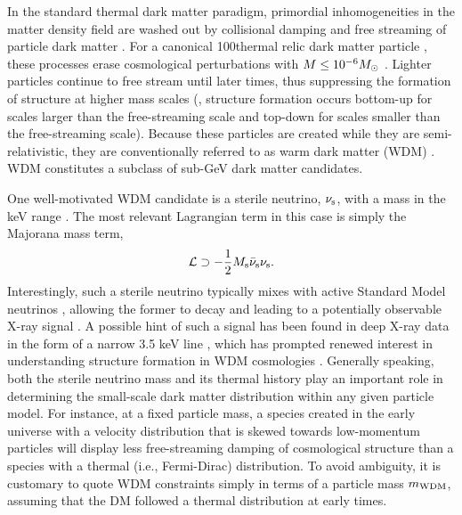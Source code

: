 In the standard thermal dark matter paradigm, primordial inhomogeneities in the matter density field are washed out by collisional damping and free streaming of particle dark matter \citep{Hofmann:2001,Green:2003un, Bertschinger:2006nq, Loeb:2005pm}.  
For a canonical 100\GeV thermal relic dark matter particle \citep[\eg, the WIMP;][]{steigman1985,Jungman:1995df}, these processes erase cosmological perturbations with $M \leq 10^{-6} M_\odot$ \citep[i.e., Earth mass;][]{Green:2003un, 2005Natur.433..389D}. 
Lighter particles continue to free stream until later times, thus suppressing the formation of structure at higher mass scales (\eg, structure formation occurs bottom-up for scales larger than the free-streaming scale and top-down for scales smaller than the free-streaming scale). Because these particles are created while they are semi-relativistic, they are conventionally referred to as warm dark matter (WDM) \citep{Bond:1983hb,Bode:2000gq,Dalcanton:2000hn}. 
WDM constitutes a subclass of sub-GeV dark matter candidates.

One well-motivated WDM candidate is a sterile neutrino, $\nu_{\rm s}$, with a mass in the keV range \citep[\eg][]{Abazajian:2017tcc,Adhikari:2017}. The most relevant Lagrangian term in this case is simply the Majorana mass term,
\begin{equation}
    \mathcal{L} \supset -\frac{1}{2}M_{\rm s}\bar{\nu}_{\rm s} \nu_{\rm s}.
\end{equation}
Interestingly, such a sterile neutrino typically mixes with active Standard Model neutrinos \citep[\eg,][]{Asaka:2005an}, allowing the former to decay and leading to a potentially observable X-ray signal \citep[\eg,][]{Abazajian:2001vt}. A possible hint of such a signal has been found in deep X-ray data in the form of a narrow 3.5 keV line \citep{Boyarsky:2014, Bulbul:2014, Boyarsky:2015, Iakubovskyi:2015}, which has prompted renewed interest in understanding structure formation in WDM cosmologies \citep[\eg,][]{Lovell:2013ola,Bose:2016irl,Bozek:2018ekc}. Generally speaking, both the sterile neutrino mass and its thermal history play an important role in determining the small-scale dark matter distribution within any given particle model. For instance, at a fixed particle mass, a species created in the early universe with a velocity distribution that is skewed towards low-momentum particles \citep[\eg,][]{Shi:1998km,Venumadhav:2015pla} will display less free-streaming damping of cosmological structure than a species with a thermal (i.e., Fermi-Dirac) distribution. To avoid ambiguity, it is customary to quote WDM constraints simply in terms of a particle mass $m_{\rm WDM}$, assuming that the DM followed a thermal distribution at early times.


